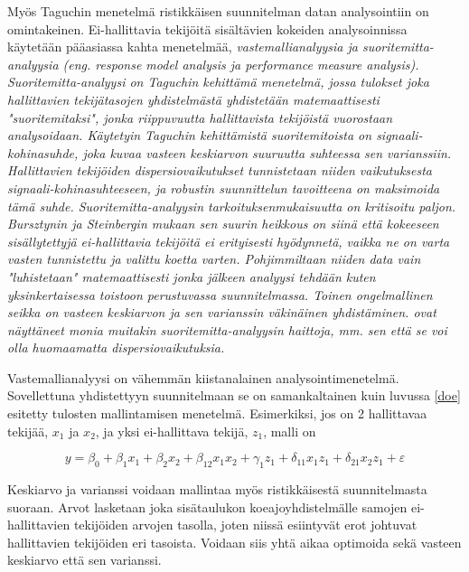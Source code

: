 \documentclass[12pt,a4paper,finnish]{tutthesis}
\begin{document}
Myös Taguchin menetelmä ristikkäisen suunnitelman datan analysointiin on
omintakeinen. Ei-hallittavia tekijöitä sisältävien kokeiden analysoinnissa
käytetään pääasiassa kahta menetelmää, \em vastemallianalyysia \em ja \em suoritemitta-analyysia \em
(eng. response model analysis ja performance measure analysis).
Suoritemitta-analyysi on Taguchin kehittämä menetelmä, jossa
tulokset joka hallittavien tekijätasojen yhdistelmästä yhdistetään matemaattisesti
"suoritemitaksi", jonka riippuvuutta hallittavista tekijöistä vuorostaan
analysoidaan. Käytetyin Taguchin kehittämistä suoritemitoista on
\em signaali-kohinasuhde, \em joka kuvaa vasteen keskiarvon suuruutta suhteessa
sen varianssiin. Hallittavien tekijöiden dispersiovaikutukset tunnistetaan
niiden vaikutuksesta signaali-kohinasuhteeseen, ja robustin suunnittelun
tavoitteena on maksimoida tämä suhde.
Suoritemitta-analyysin tarkoituksenmukaisuutta on kritisoitu paljon.
Bursztynin ja Steinbergin \parencite*{Bursztyn} mukaan sen suurin heikkous on siinä että
kokeeseen sisällytettyjä ei-hallittavia tekijöitä ei
erityisesti hyödynnetä,
vaikka ne on varta vasten tunnistettu ja valittu koetta varten. Pohjimmiltaan
niiden data vain "luhistetaan" matemaattisesti jonka jälkeen analyysi
tehdään kuten yksinkertaisessa toistoon perustuvassa suunnitelmassa.
Toinen ongelmallinen seikka on vasteen keskiarvon ja sen varianssin
väkinäinen yhdistäminen.
\textcite{box1988,steinberg1994} ovat näyttäneet monia muitakin suoritemitta-analyysin
haittoja, mm. sen että se voi olla huomaamatta dispersiovaikutuksia.

Vastemallianalyysi on vähemmän kiistanalainen analysointimenetelmä.
Sovellettuna yhdistettyyn suunnitelmaan se on samankaltainen kuin
luvussa \ref{doe} esitetty tulosten mallintamisen
menetelmä. Esimerkiksi, jos on 2 hallittavaa tekijää, $x_1$ ja $x_2$, ja yksi
ei-hallittava tekijä, $z_1$, malli on

\begin{equation}
  \label{eq:vastemalli}
 y = \beta _0 + \beta _{1}x_1 + \beta _{2}x_2 + \beta _{12}x_{1}x_{2} + \gamma _{1}z_1 + \delta _{11}x_{1}z_{1} + \delta _{21}x_{2}z_1 + \varepsilon
\end{equation}

Keskiarvo ja varianssi voidaan mallintaa myös ristikkäisestä suunnitelmasta suoraan.
Arvot lasketaan joka sisätaulukon koeajoyhdistelmälle
samojen ei-hallittavien tekijöiden arvojen tasolla,
joten niissä esiintyvät erot johtuvat hallittavien tekijöiden eri tasoista. Voidaan
siis yhtä aikaa optimoida sekä vasteen keskiarvo että sen varianssi.
\end{document}
